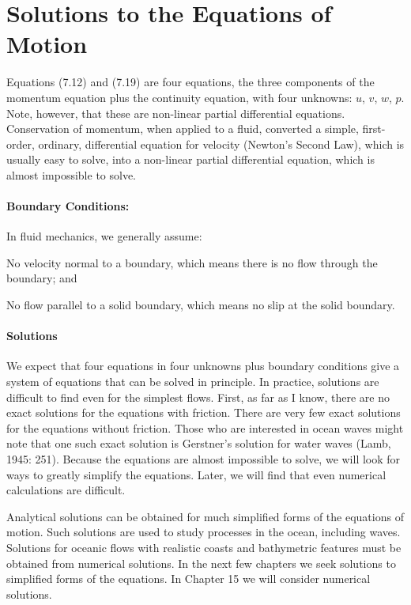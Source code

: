 \section{Solutions to the Equations of Motion}
Equations (7.12) and (7.19) are four equations, the three components
of the momentum equation plus the continuity equation, with four
unknowns: $u$, $v$, $w$, $p$. Note, however, that these are non-linear
partial differential equations.  Conservation of momentum, when
applied to a fluid, converted a simple, first-order, ordinary,
differential equation for velocity (Newton's Second Law), which is
usually easy to solve, into a non-linear partial differential
equation, which is almost impossible to solve.

\paragraph{Boundary Conditions:}
In fluid mechanics, we generally assume:
\begin{enumerate}
\vitem No velocity normal to a boundary, which means there is no flow
through the boundary; and

\vitem No flow parallel to a solid boundary, which means no slip at
the solid boundary.
\end{enumerate}

\paragraph{Solutions}
We expect that four equations in four unknowns plus boundary
conditions give a system of equations that can be solved in
principle. In practice, solutions are difficult to find even for the
simplest flows. First, as far as I know, there are no exact solutions
for the equations with friction. There are very few exact solutions
for the equations without friction. Those who are interested in ocean
waves might note that one such exact solution is Gerstner's solution
for water waves (Lamb, 1945: 251). Because the equations are almost
impossible to solve, we will look for ways to greatly simplify the
equations. Later, we will find that even numerical calculations are
difficult.

Analytical solutions can be obtained for much simplified forms of the
equations of motion. Such solutions are used to study processes in the
ocean, including waves. Solutions for oceanic flows with realistic
coasts and bathymetric features must be obtained from numerical
solutions. In the next few chapters we seek solutions to simplified
forms of the equations. In Chapter 15 we will consider numerical
solutions.

